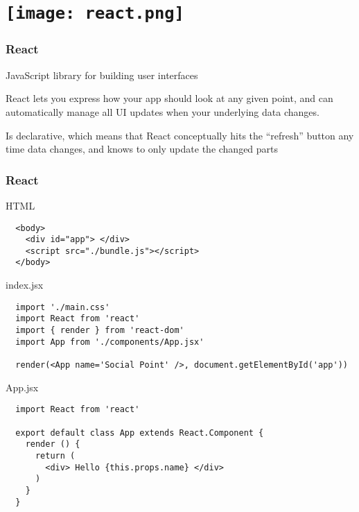 \section{\texorpdfstring{\texttt{[image: react.png]}}{React}}

\begin{frame}

  \frametitle{React}

  JavaScript library for building user interfaces

  React lets you express how your app should look at any given point, and can automatically manage all UI updates when your underlying data changes.

  Is declarative, which means that React conceptually hits the “refresh” button any time data changes, and knows to only update the changed parts

\end{frame}

\begin{frame}[fragile]

  \frametitle{React}

  HTML
  \begin{verbatim}
  <body>
    <div id="app"> </div>
    <script src="./bundle.js"></script>
  </body>
  \end{verbatim}

  index.jsx
  \begin{verbatim}
  import './main.css'
  import React from 'react'
  import { render } from 'react-dom'
  import App from './components/App.jsx'

  render(<App name='Social Point' />, document.getElementById('app'))
  \end{verbatim}

  App.jsx
  \begin{verbatim}
  import React from 'react'

  export default class App extends React.Component {
    render () {
      return (
        <div> Hello {this.props.name} </div>
      )
    }
  }
  \end{verbatim}

\end{frame}

